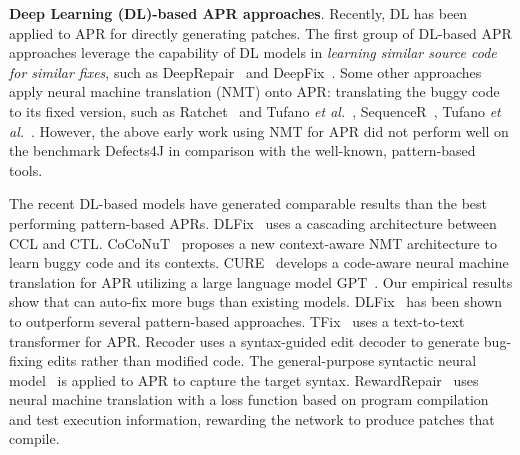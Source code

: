 {\bf Deep Learning (DL)-based APR approaches}. Recently, DL has been
applied to APR for directly generating patches.  The first group of
DL-based APR approaches leverage the capability of DL models in {\em
  learning similar source code for similar fixes}, such as
DeepRepair~\cite{white2016deep} and DeepFix~\cite{gupta2017deepfix}.
Some other approaches apply neural machine translation (NMT) onto APR:
translating the buggy code to its fixed version, such as
Ratchet~\cite{hata2018learning} and Tufano {\em et
  al.}~\cite{tufano2018empirical}, SequenceR~\cite{chen2018sequencer},
Tufano {\em et al.}~\cite{tufano2019learning}. However, the above
early work using NMT for APR did not perform well on the benchmark
Defects4J in comparison with the well-known, pattern-based tools.

The recent DL-based models have generated comparable results than the best performing pattern-based
APRs. DLFix~\cite{icse20} uses a cascading architecture
between CCL and CTL.
CoCoNuT~\cite{lutellier2020coconut} proposes a new context-aware NMT
architecture to learn buggy code and its
contexts. CURE~\cite{cure-icse21} develops a code-aware neural machine
translation for APR utilizing a large language model
GPT~\cite{radford2018improving}. Our empirical results show that
{\tool} can auto-fix more bugs than existing models. DLFix~\cite{icse20} has been shown to outperform several
pattern-based approaches. TFix~\cite{tfix-21} uses a text-to-text
transformer for APR. Recoder \cite{recoder-fse21} uses a syntax-guided edit
decoder to generate bug-fixing edits rather than modified code.  The
general-purpose syntactic neural
model~\cite{yin-neubig-2017-syntactic} is applied to APR to
capture the target syntax. RewardRepair~\cite{monperrus-icse22} uses
neural machine translation with a loss function based on program
compilation and test execution information, rewarding the network to
produce patches that compile.
  

